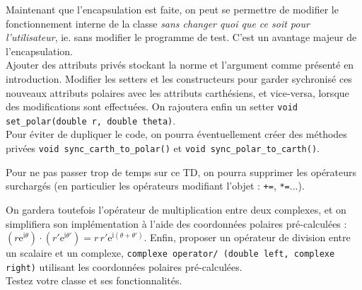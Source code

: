 \documentclass{book}
\newcommand{\inline}[1]{\texttt{#1}}
\begin{document}
Maintenant que l'encapsulation est faite, on peut se permettre de modifier le fonctionnement interne de la classe \emph{sans changer quoi que ce soit pour l'utilisateur}, ie. sans modifier le programme de test. C'est un avantage majeur de l'encapsulation.\\

Ajouter des attributs privés stockant la norme et l'argument comme présenté en introduction. Modifier les setters et les constructeurs pour garder sychronisé ces nouveaux attributs polaires avec les attributs carthésiens, et vice-versa, lorsque des modifications sont effectuées. On rajoutera enfin un setter \inline{void set_polar(double r, double theta)}.\\

Pour éviter de dupliquer le code, on pourra éventuellement créer des méthodes privées \inline{void sync_carth_to_polar()} et \inline{void sync_polar_to_carth()}.

Pour ne pas passer trop de temps sur ce TD, on pourra supprimer les opérateurs surchargés (en particulier les opérateurs modifiant l'objet : \inline{+=}, \inline{*=}...).

On gardera toutefois l'opérateur de multiplication entre deux complexes, et on simplifiera son implémentation à l'aide des coordonnées polaires pré-calculées : $(r\mathrm{e}^{\mathrm{i}\theta})\cdot(r'\mathrm{e}^{\mathrm{i}\theta'})=r\,r'\mathrm{e}^{\mathrm{i}(\theta+\theta')}$.
Enfin, proposer un opérateur de division entre un scalaire et un complexe, \inline{complexe operator/ (double left, complexe right)} utilisant les coordonnées polaires pré-calculées.\\

Testez votre classe et ses fonctionnalités.
\end{document}
